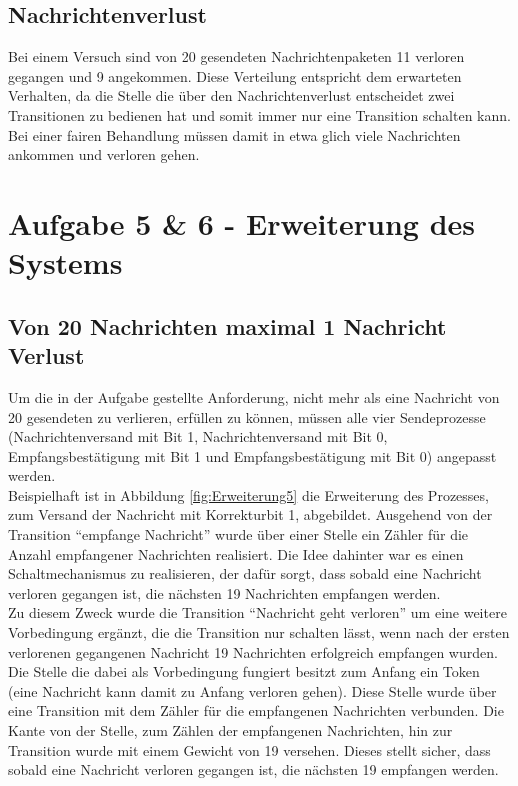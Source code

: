 \documentclass[10pt]{scrartcl}
\begin{document}
\subsection{Nachrichtenverlust}
Bei einem Versuch sind von 20 gesendeten Nachrichtenpaketen 11 verloren gegangen und 9 angekommen. Diese Verteilung entspricht dem erwarteten Verhalten, da die Stelle die über den Nachrichtenverlust entscheidet zwei Transitionen zu bedienen hat und somit immer nur eine Transition schalten kann. Bei einer fairen Behandlung müssen damit in etwa glich viele Nachrichten ankommen und verloren gehen.

\section{Aufgabe 5 \& 6 - Erweiterung des Systems}
\subsection{Von 20 Nachrichten maximal 1 Nachricht Verlust}
\label{sec:nachrichtenverlust_1}
Um die in der Aufgabe gestellte Anforderung, nicht mehr als eine Nachricht von 20 gesendeten zu verlieren, erfüllen zu können, müssen alle vier Sendeprozesse (Nachrichtenversand mit Bit 1, Nachrichtenversand mit Bit 0, Empfangsbestätigung mit Bit 1 und Empfangsbestätigung mit Bit 0) angepasst werden.\\
Beispielhaft ist in Abbildung \ref{fig:Erweiterung5} die Erweiterung des Prozesses, zum Versand der Nachricht mit Korrekturbit 1, abgebildet.
Ausgehend von der Transition "`empfange Nachricht"' wurde über einer Stelle ein Zähler für die Anzahl empfangener Nachrichten realisiert. 
Die Idee dahinter war es einen Schaltmechanismus zu realisieren, der dafür sorgt, dass sobald eine Nachricht verloren gegangen ist, die nächsten 19 Nachrichten empfangen werden.\\
Zu diesem Zweck wurde die Transition "`Nachricht geht verloren"' um eine weitere Vorbedingung ergänzt, die die Transition nur schalten lässt, wenn nach der ersten verlorenen gegangenen Nachricht 19 Nachrichten erfolgreich empfangen wurden. Die Stelle die dabei als Vorbedingung fungiert besitzt zum Anfang ein Token (eine Nachricht kann damit zu Anfang verloren gehen).
Diese Stelle wurde über eine Transition mit dem Zähler für die empfangenen Nachrichten verbunden.
Die Kante von der Stelle, zum Zählen der empfangenen Nachrichten, hin zur Transition wurde mit einem Gewicht von 19 versehen.
Dieses stellt sicher, dass sobald eine Nachricht verloren gegangen ist, die nächsten 19 empfangen werden.  
\end{document}
